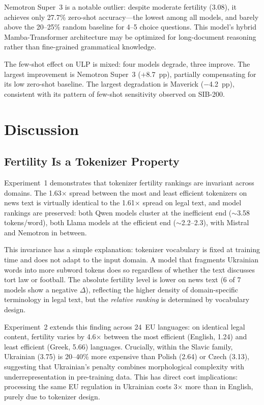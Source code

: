 \documentclass[11pt,a4paper]{article}
\begin{document}
Nemotron Super~3 is a notable outlier: despite moderate fertility (3.08), it achieves only 27.7\% zero-shot accuracy---the lowest among all models, and barely above the 20--25\% random baseline for 4--5 choice questions. This model's hybrid Mamba-Transformer architecture may be optimized for long-document reasoning rather than fine-grained grammatical knowledge.

The few-shot effect on ULP is mixed: four models degrade, three improve. The largest improvement is Nemotron Super~3 ($+$8.7~pp), partially compensating for its low zero-shot baseline. The largest degradation is Maverick ($-$4.2~pp), consistent with its pattern of few-shot sensitivity observed on SIB-200.

\section{Discussion}

\subsection{Fertility Is a Tokenizer Property}

Experiment~1 demonstrates that tokenizer fertility rankings are invariant across domains. The 1.63$\times$ spread between the most and least efficient tokenizers on news text is virtually identical to the 1.61$\times$ spread on legal text, and model rankings are preserved: both Qwen models cluster at the inefficient end (${\sim}$3.58 tokens/word), both Llama models at the efficient end (${\sim}$2.2--2.3), with Mistral and Nemotron in between.

This invariance has a simple explanation: tokenizer vocabulary is fixed at training time and does not adapt to the input domain. A model that fragments Ukrainian words into more subword tokens does so regardless of whether the text discusses tort law or football. The absolute fertility level is lower on news text (6 of 7 models show a negative $\Delta$), reflecting the higher density of domain-specific terminology in legal text, but the \emph{relative ranking} is determined by vocabulary design.

Experiment~2 extends this finding across 24~EU languages: on identical legal content, fertility varies by 4.6$\times$ between the most efficient (English, 1.24) and least efficient (Greek, 5.66) languages. Crucially, within the Slavic family, Ukrainian (3.75) is 20--40\% more expensive than Polish (2.64) or Czech (3.13), suggesting that Ukrainian's penalty combines morphological complexity with underrepresentation in pre-training data. This has direct cost implications: processing the same EU regulation in Ukrainian costs 3$\times$ more than in English, purely due to tokenizer design.
\end{document}
